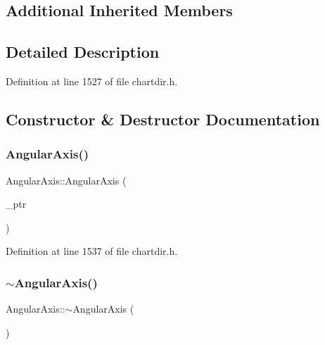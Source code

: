 \subsection*{Additional Inherited Members}


\subsection{Detailed Description}


Definition at line 1527 of file chartdir.\+h.



\subsection{Constructor \& Destructor Documentation}
\mbox{\label{class_angular_axis_a5ea5e1163079a9decf8323a232d4210a}} 
\subsubsection{\texorpdfstring{Angular\+Axis()}{AngularAxis()}}
{\footnotesize\ttfamily Angular\+Axis\+::\+Angular\+Axis (\begin{DoxyParamCaption}\item[{Angular\+Axis\+Internal $\ast$}]{\+\_\+ptr }\end{DoxyParamCaption})\hspace{0.3cm}{\ttfamily [inline]}}



Definition at line 1537 of file chartdir.\+h.

\mbox{\label{class_angular_axis_a72ea8b4c42e00cddd9f1bfabd0bcae8c}} 
\subsubsection{\texorpdfstring{$\sim$\+Angular\+Axis()}{~AngularAxis()}}
{\footnotesize\ttfamily Angular\+Axis\+::$\sim$\+Angular\+Axis (\begin{DoxyParamCaption}{ }\end{DoxyParamCaption})\hspace{0.3cm}{\ttfamily [inline]}}



